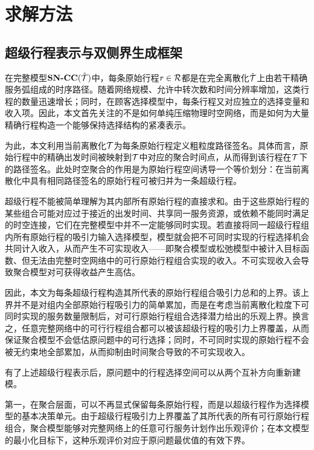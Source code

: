\chapter{求解方法}\label{sec:solution_methodology}

\section{超级行程表示与双侧界生成框架}
\label{sec:algorithm}

在完整模型$\textbf{SN-CC}({\hat{\mathcal{T}}})$中，每条原始行程$r\in\mathcal{R}$都是在完全离散化$\hat{\mathcal{T}}$上由若干精确服务弧组成的时序路径。随着网络规模、允许中转次数和时间分辨率增加，这类行程的数量迅速增长；同时，在顾客选择模型中，每条行程又对应独立的选择变量和收入项。因此，本文首先关注的不是如何单纯压缩物理时空网络，而是如何为大量精确行程构造一个能够保持选择结构的紧凑表示。

为此，本文利用当前离散化$\mathcal{T}$为每条原始行程定义粗粒度路径签名。具体而言，原始行程中的精确出发时间被映射到$\mathcal{T}$中对应的聚合时间点，从而得到该行程在$\mathcal{T}$下的路径签名。此处时空聚合的作用是为原始行程空间诱导一个等价划分：在当前离散化中具有相同路径签名的原始行程可被归并为一条超级行程。

超级行程不能被简单理解为其内部所有原始行程的直接求和。由于这些原始行程的某些组合可能对应过于接近的出发时间、共享同一服务资源，或依赖不能同时满足的时空连接，它们在完整模型中并不一定能够同时实现。若直接将同一超级行程组内所有原始行程的吸引力输入选择模型，模型就会把不可同时实现的行程选择机会共同计入收入，从而产生不可实现收入——即聚合模型或松弛模型中被计入目标函数、但无法由完整时空网络中的可行原始行程组合实现的收入。不可实现收入会导致聚合模型对可获得收益产生高估。

因此，本文为每条超级行程构造其所代表的原始行程组合吸引力总和的上界。该上界并不是对组内全部原始行程吸引力的简单累加，而是在考虑当前离散化粒度下可同时实现的服务数量限制后，对可行原始行程组合选择潜力给出的乐观上界。换言之，任意完整网络中的可行行程组合都可以被该超级行程的吸引力上界覆盖，从而保证聚合模型不会低估原问题中的可行选择；同时，不可同时实现的原始行程不会被无约束地全部累加，从而抑制由时间聚合导致的不可实现收入。

有了上述超级行程表示后，原问题中的行程选择空间可以从两个互补方向重新建模。

第一，在聚合层面，可以不再显式保留每条原始行程，而是以超级行程作为选择模型的基本决策单元。由于超级行程吸引力上界覆盖了其所代表的所有可行原始行程组合，聚合模型能够对完整网络上的任意可行服务计划作出乐观评价；在本文模型的最小化目标下，这种乐观评价对应于原问题最优值的有效下界。

